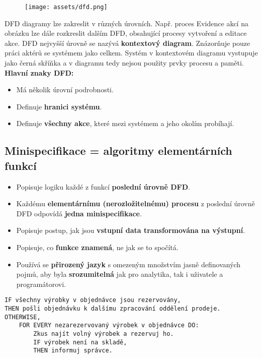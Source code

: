 \begin{figure}[H]
    \centering
    \texttt{[image: assets/dfd.png]}
\end{figure}

DFD diagramy lze zakreslit v různých úrovních. Např. proces Evidence akcí na obrázku lze dále rozkreslit dalším DFD, obsahující procesy vytvoření a editace akce. DFD nejvyšší úrovně se nazývá \textbf{kontextový diagram}. Znázorňuje pouze práci aktérů se systémem jako celkem. Systém v kontextovém diagramu vystupuje jako černá skříňka a v diagramu tedy nejsou použity prvky procesu a paměti.
\textbf{Hlavní znaky DFD:}

\begin{itemize}
    \item Má několik úrovní podrobnosti.
    \item Definuje \textbf{hranici systému}.
    \item Definuje \textbf{všechny akce}, které mezi systémem a jeho okolím probíhají.
\end{itemize}

\subsection{Minispecifikace = algoritmy elementárních funkcí}
\begin{itemize}
    \item Popisuje logiku každé z funkcí \textbf{poslední úrovně DFD}.
    \item Každému \textbf{elementárnímu (nerozložitelnému) procesu} z poslední úrovně DFD odpovídá \textbf{jedna minispecifikace}.
    \item Popisuje postup, jak jsou \textbf{vstupní data transformována na výstupní}.
    \item Popisuje, co \textbf{funkce znamená}, ne jak se to spočítá.
    \item Používá se \textbf{přirozený jazyk} s omezeným množstvím jasně definovaných pojmů, aby byla \textbf{srozumitelná} jak pro analytika, tak i uživatele a programátorovi.
\end{itemize}

\smallskip
\begin{verbatim}
IF všechny výrobky v objednávce jsou rezervovány,
THEN pošli objednávku k dalšímu zpracování oddělení prodeje.
OTHERWISE,
	FOR EVERY nezarezervovaný výrobek v objednávce DO:
		Zkus najít volný výrobek a rezervuj ho.
		IF výrobek není na skladě,
		THEN informuj správce.
\end{verbatim}